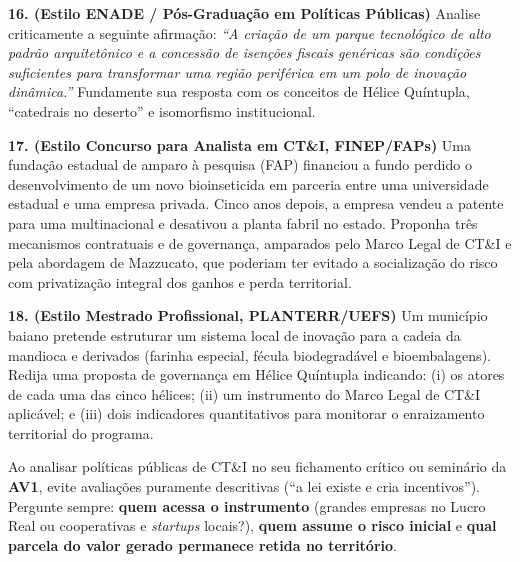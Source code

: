 
\textbf{16. (Estilo ENADE / Pós-Graduação em Políticas Públicas)} Analise criticamente a seguinte afirmação: \textit{``A criação de um parque tecnológico de alto padrão arquitetônico e a concessão de isenções fiscais genéricas são condições suficientes para transformar uma região periférica em um polo de inovação dinâmica.''} Fundamente sua resposta com os conceitos de Hélice Quíntupla, ``catedrais no deserto'' e isomorfismo institucional.
\espacoResolucao[2.2cm]

\textbf{17. (Estilo Concurso para Analista em CT\&I, FINEP/FAPs)} Uma fundação estadual de amparo à pesquisa (FAP) financiou a fundo perdido o desenvolvimento de um novo bioinseticida em parceria entre uma universidade estadual e uma empresa privada. Cinco anos depois, a empresa vendeu a patente para uma multinacional e desativou a planta fabril no estado. Proponha três mecanismos contratuais e de governança, amparados pelo Marco Legal de CT\&I e pela abordagem de Mazzucato, que poderiam ter evitado a socialização do risco com privatização integral dos ganhos e perda territorial.
\espacoResolucao[2.2cm]

\textbf{18. (Estilo Mestrado Profissional, PLANTERR/UEFS)} Um município baiano pretende estruturar um sistema local de inovação para a cadeia da mandioca e derivados (farinha especial, fécula biodegradável e bioembalagens). Redija uma proposta de governança em Hélice Quíntupla indicando: (i) os atores de cada uma das cinco hélices; (ii) um instrumento do Marco Legal de CT\&I aplicável; e (iii) dois indicadores quantitativos para monitorar o enraizamento territorial do programa.
\espacoResolucao[2.2cm]

\begin{boxDica}
Ao analisar políticas públicas de CT\&I no seu fichamento crítico ou seminário da \textbf{AV1}, evite avaliações puramente descritivas (``a lei existe e cria incentivos''). Pergunte sempre: \textbf{quem acessa o instrumento} (grandes empresas no Lucro Real ou cooperativas e \textit{startups} locais?), \textbf{quem assume o risco inicial} e \textbf{qual parcela do valor gerado permanece retida no território}.
\end{boxDica}

\clearpage
{}

